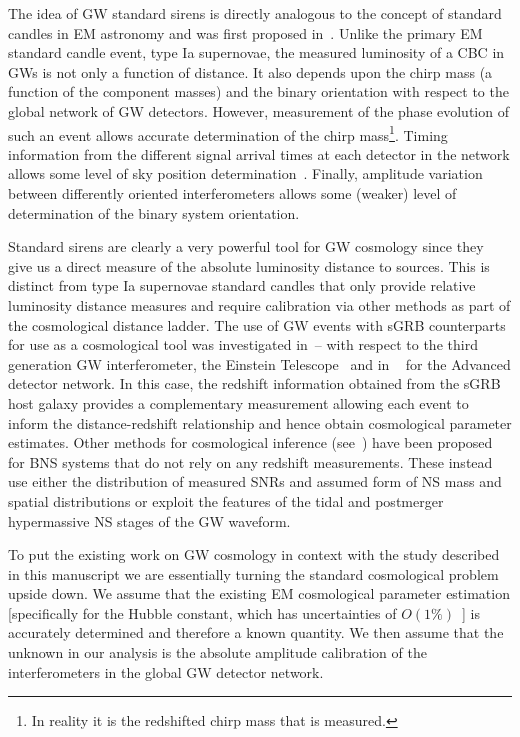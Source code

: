 \documentclass[prd, twocolumn, lengthcheck, superscriptaddress, showpacs, letterpaper, nofootinbib]{revtex4-1}
\begin{document}
The idea of \ac{GW} standard sirens is directly analogous to the concept of
standard candles in \ac{EM} astronomy and was first proposed
in~\cite{1986Natur.323..310S}. Unlike the primary \ac{EM} standard candle
event, type Ia supernovae, the measured luminosity of a \ac{CBC} in \acp{GW} is
not only a function of distance. It also depends upon the chirp mass (a
function of the component masses) and the binary orientation with respect to
the global network of \ac{GW} detectors. However, measurement of the
phase evolution of such an event allows accurate determination of the chirp
mass\footnote{In reality it is the redshifted chirp mass that is measured.}.
Timing information from the different signal arrival times at each detector in
the network allows some level of sky position
determination~\cite{2014ApJ...795..105S}.  Finally, amplitude variation between
differently oriented interferometers allows some (weaker) level of
determination of the binary system orientation.

Standard sirens are clearly a very powerful tool for \ac{GW} cosmology since
they give us a direct measure of the absolute luminosity distance to sources.
This is distinct from type Ia supernovae standard candles that only provide
relative luminosity distance measures and require calibration via other methods
as part of the cosmological distance ladder. The use of \ac{GW} events with
\ac{sGRB} counterparts for use as a cosmological tool was investigated
in~\cite{2010CQGra..27u5006S}--\cite{2011PhRvD..83b3005Z} with respect to
the third generation \ac{GW} interferometer, the
Einstein Telescope~\cite{2010CQGra..27h4007P} and in ~\cite{2012PhRvD..85b3535T}
for the Advanced detector network. In this case, the redshift information
obtained from the \ac{sGRB} host galaxy provides a complementary measurement
allowing each event to inform the distance-redshift relationship and hence
obtain cosmological parameter estimates. Other methods for cosmological
inference (see~\cite{1996PhRvD..53.2878F,2012PhRvD..85b3535T,
2012PhRvD..86b3502T,Messenger:2011ux,2013arXiv1312.1862M}) have been proposed
for \ac{BNS} systems that do not rely on any redshift measurements. These
instead use either the distribution of measured \acp{SNR} and assumed
form of \ac{NS} mass and spatial distributions or exploit the
features of the tidal and postmerger hypermassive \ac{NS} stages of the
\ac{GW} waveform. 

To put the existing work on \ac{GW} cosmology in context with the study
described in this manuscript we are essentially turning the standard
cosmological problem upside down. We assume that the existing \ac{EM}
cosmological parameter estimation [specifically for the Hubble constant, which
has uncertainties of $O(1\%)$~\cite{2015arXiv150201589P}] is
accurately determined and therefore a known quantity. We then assume that the
unknown in our analysis is the absolute amplitude calibration of the
interferometers in the global \ac{GW} detector network.    
\end{document}
